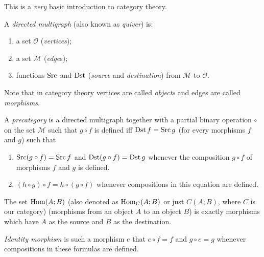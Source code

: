 This is a \emph{very} basic introduction to category theory.
\begin{defn}
A \emph{directed multigraph} (also known
as \emph{quiver}) is:
\begin{enumerate}
\item {}a set $\mathcal{O}$ (\emph{vertices});
\item {}a set $\mathcal{M}$ (\emph{edge}s);
\item {}functions $\operatorname{Src}$ and $\operatorname{Dst}$ (\emph{source}
and \emph{destination}) from $\mathcal{M}$ to $\mathcal{O}$.
\end{enumerate}
\end{defn}
Note that in category theory vertices
are called \emph{objects} and edges are called \emph{morphisms}.
\begin{defn}
A \emph{precategory} is a directed multigraph
together with a partial binary operation $\circ$ on the set $\mathcal{M}$
such that $g\circ f$ is defined iff $\operatorname{Dst} f=\operatorname{Src} g$ (for every morphisms
$f$ and $g$) such that
\begin{enumerate}
\item $\operatorname{Src}(g\circ f)=\operatorname{Src} f$ and $\operatorname{Dst}(g\circ f)=\operatorname{Dst} g$ whenever the
composition $g\circ f$ of morphisms $f$ and $g$ is defined.
\item $(h\circ g)\circ f=h\circ(g\circ f)$ whenever compositions in this
equation are defined.
\end{enumerate}
\end{defn}

\begin{defn}
The set $\operatorname{Hom}(A;B)$ (also denoted as $\operatorname{Hom}_{C}(A;B)$ or just $C(A;B)$,
where $C$ is our category) (morphisms from an object $A$ to an object
$B$) is exactly morphisms which have $A$ as the source and $B$
as the destination.
\end{defn}

\begin{defn}
\emph{Identity morphism} is such a morphism
$e$ that $e\circ f=f$ and $g\circ e=g$ whenever compositions in
these formulas are defined.
\end{defn}

